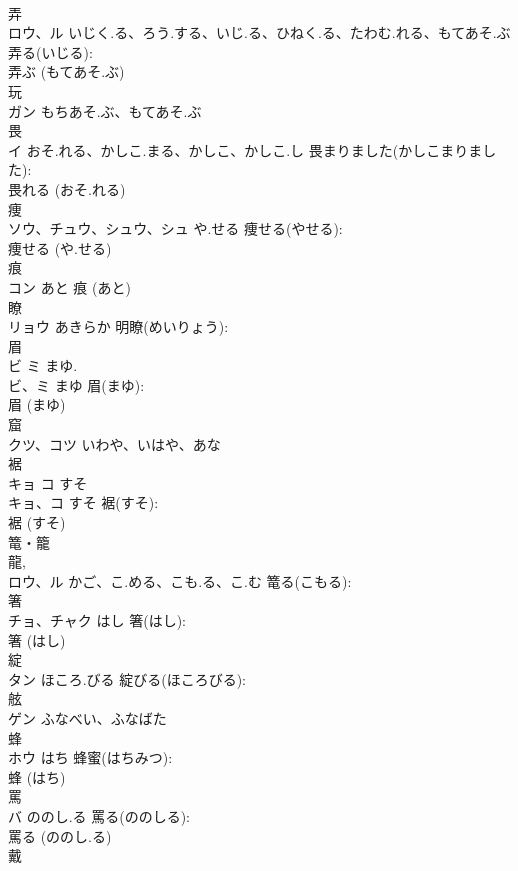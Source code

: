 \documentclass[8pt]{extreport}
\begin{document}
\begin{CJK}{UTF8}{min}
\\	弄			
\\	ロウ、ル	いじく.る、ろう.する、いじ.る、ひねく.る、たわむ.れる、もてあそ.ぶ	弄る(いじる): 
\\	弄ぶ (もてあそ.ぶ)
\\	玩			
\\	ガン	もちあそ.ぶ、もてあそ.ぶ		
\\	畏			
\\	イ	おそ.れる、かしこ.まる、かしこ、かしこ.し	畏まりました(かしこまりました): 
\\	畏れる (おそ.れる)
\\	痩			
\\	ソウ、チュウ、シュウ、シュ	や.せる	痩せる(やせる): 
\\	痩せる (や.せる)
\\	痕			
\\	コン	あと		痕 (あと)
\\	瞭			
\\	リョウ	あきらか	明瞭(めいりょう): 
\\	眉			
\\	ビ ミ まゆ.	
\\	ビ、ミ	まゆ	眉(まゆ): 
\\	眉 (まゆ)
\\	窟			
\\	クツ、コツ	いわや、いはや、あな		
\\	裾			
\\	キョ コ すそ 
\\	キョ、コ	すそ	裾(すそ): 
\\	裾 (すそ)
\\	篭・籠			
\\	龍, 
\\	ロウ、ル	かご、こ.める、こも.る、こ.む	篭る(こもる): 
\\	箸			
\\	チョ、チャク	はし	箸(はし): 
\\	箸 (はし)
\\	綻			
\\	タン	ほころ.びる	綻びる(ほころびる): 
\\	舷			
\\	ゲン	ふなべい、ふなばた		
\\	蜂			
\\	ホウ	はち	蜂蜜(はちみつ): 
\\	蜂 (はち)
\\	罵			
\\	バ	ののし.る	罵る(ののしる): 
\\	罵る (ののし.る)
\\	戴			

\end{CJK}
\end{document}
